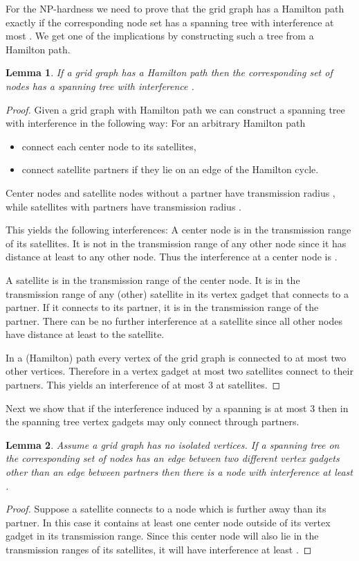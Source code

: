\documentclass{article}
\theoremstyle{plain}
\newtheorem{lem}{Lemma}
\theoremstyle{definition}
\theoremstyle{remark}
\begin{document}
For the NP-hardness we need to prove that the grid graph has a Hamilton path exactly if
the corresponding node set has a spanning tree with interference at most .
We get one of the implications by constructing such a tree from a Hamilton path.

\begin{lem}\label{lem:HPtoST}
If a grid graph has a Hamilton path then the corresponding set of nodes
has a spanning tree with interference .
\end{lem}
\begin{proof}
Given a grid graph with Hamilton path we can construct a spanning tree
with interference  in the following way: For an arbitrary Hamilton path
\begin{itemize}
\item connect each center node to its satellites,
\item connect satellite partners if they lie on an edge of the Hamilton
cycle.
\end{itemize}
Center nodes and satellite nodes without a partner have transmission radius
, while satellites with partners have transmission radius .

This yields the following interferences:
A center node is in the transmission range of its satellites. It
is not in the transmission range of any other node since it has distance
at least  to any other node. Thus the interference at a center node is
.

A satellite is in the transmission range of the center node.
It is in the transmission range of any (other) satellite in its vertex gadget that
connects to a partner. If it connects to its partner, it is in the
transmission range of the partner. There can be no further interference
at a satellite since all other nodes have distance at least  to the
satellite.

In a (Hamilton) path every vertex of the
grid graph is connected to at most two other vertices. Therefore in a
vertex gadget at most two satellites connect to their partners. This
yields an interference of at most 3 at satellites.
\end{proof}

Next we show that if the
interference induced by a spanning is at most 3
then in the spanning tree
vertex gadgets may only connect through partners.
 \begin{lem}\label{lem:partners}
Assume a grid graph has no isolated vertices. If a spanning tree on the corresponding set
of nodes has an edge between two different vertex gadgets other than an edge between
partners then there is a node with interference at least .
\end{lem}
\begin{proof}
Suppose a satellite connects to a node which is further away than its partner. In this
case it contains at least one center node outside of its vertex gadget in its
transmission range.
Since this center node will also lie in the transmission ranges of its satellites, it
will have interference at least .
\end{proof}
\end{document}
